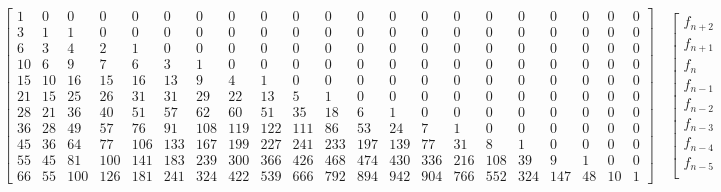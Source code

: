 \begin{sidewaystable}
    \begin{displaymath}
        \left[
            \begin{array}{ccccccccccccccccccccc}
                1 & 0 & 0 & 0 & 0 & 0 & 0 & 0 & 0 & 0 & 0 & 0 & 0 & 0 & 0 & 0 & 0 & 0 & 0 & 0 & 0\\
                3 & 1 & 1 & 0 & 0 & 0 & 0 & 0 & 0 & 0 & 0 & 0 & 0 & 0 & 0 & 0 & 0 & 0 & 0 & 0 & 0\\
                6 & 3 & 4 & 2 & 1 & 0 & 0 & 0 & 0 & 0 & 0 & 0 & 0 & 0 & 0 & 0 & 0 & 0 & 0 & 0 & 0\\
                10 & 6 & 9 & 7 & 6 & 3 & 1 & 0 & 0 & 0 & 0 & 0 & 0 & 0 & 0 & 0 & 0 & 0 & 0 & 0 & 0\\
                15 & 10 & 16 & 15 & 16 & 13 & 9 & 4 & 1 & 0 & 0 & 0 & 0 & 0 & 0 & 0 & 0 & 0 & 0 & 0 & 0\\
                21 & 15 & 25 & 26 & 31 & 31 & 29 & 22 & 13 & 5 & 1 & 0 & 0 & 0 & 0 & 0 & 0 & 0 & 0 & 0 & 0\\
                28 & 21 & 36 & 40 & 51 & 57 & 62 & 60 & 51 & 35 & 18 & 6 & 1 & 0 & 0 & 0 & 0 & 0 & 0 & 0 & 0\\
                36 & 28 & 49 & 57 & 76 & 91 & 108 & 119 & 122 & 111 & 86 & 53 & 24 & 7 & 1 & 0 & 0 & 0 & 0 & 0 & 0\\
                45 & 36 & 64 & 77 & 106 & 133 & 167 & 199 & 227 & 241 & 233 & 197 & 139 & 77 & 31 & 8 & 1 & 0 & 0 & 0 & 0\\
                55 & 45 & 81 & 100 & 141 & 183 & 239 & 300 & 366 & 426 & 468 & 474 & 430 & 336 & 216 & 108 & 39 & 9 & 1 & 0 & 0\\
                66 & 55 & 100 & 126 & 181 & 241 & 324 & 422 & 539 & 666 & 792 & 894 & 942 & 904 & 766 & 552 & 324 & 147 & 48 & 10 & 1
            \end{array}
            \right]  \quad %
            \left[
                \begin{array}{c}
                    f_{n + 2}\\
                    f_{n + 1}\\
                    f_{n}\\
                    f_{n - 1}\\
                    f_{n - 2}\\
                    f_{n - 3}\\
                    f_{n - 4}\\
                    f_{n - 5}\\

\end{array}
\end{displaymath}
\end{sidewaystable}

